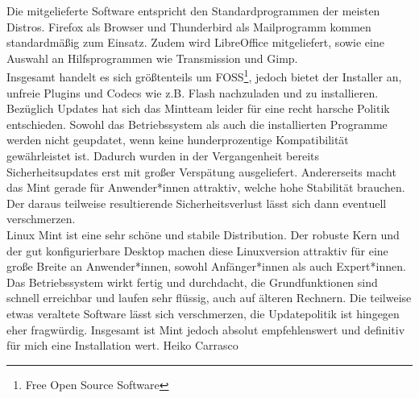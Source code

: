 {{		Die mitgelieferte Software entspricht den Standardprogrammen der meisten Distros. Firefox als Browser und Thunderbird als Mailprogramm
		kommen standardmäßig zum Einsatz. Zudem wird LibreOffice mitgeliefert,
		sowie eine Auswahl an Hilfsprogrammen wie Transmission und Gimp.\\
		Insgesamt handelt es sich größtenteils um FOSS\footnote{Free Open Source Software}, jedoch bietet der Installer an,
		unfreie Plugins und Codecs wie z.B. Flash nachzuladen und zu
		installieren.\columnbreak\\
		Bezüglich Updates hat sich das Mintteam leider für eine recht harsche Politik entschieden. Sowohl das Betriebssystem als auch die
		installierten Programme werden nicht geupdatet, wenn keine hunderprozentige Kompatibilität gewährleistet ist. Dadurch wurden in der
		Vergangenheit bereits Sicherheitsupdates erst mit großer Verspätung ausgeliefert. Andererseits macht das Mint gerade für Anwender*innen
		attraktiv, welche hohe Stabilität brauchen. Der daraus teilweise
		resultierende Sicherheitsverlust lässt sich dann eventuell verschmerzen.
		\medskip\\
		Linux Mint ist eine sehr schöne und stabile Distribution. Der robuste Kern und der gut konfigurierbare Desktop machen diese Linuxversion
		attraktiv für eine große Breite an Anwender*innen, sowohl Anfänger*innen als auch Expert*innen. Das Betriebssystem wirkt fertig und durchdacht,
		die Grundfunktionen sind schnell erreichbar und laufen sehr flüssig, auch auf älteren Rechnern. Die teilweise etwas veraltete Software
		lässt sich verschmerzen, die Updatepolitik ist hingegen eher fragwürdig. Insgesamt ist Mint jedoch absolut empfehlenswert und definitiv für mich
		eine Installation wert.
	}
	{Heiko Carrasco}}

\vfill
{}


\newpage
